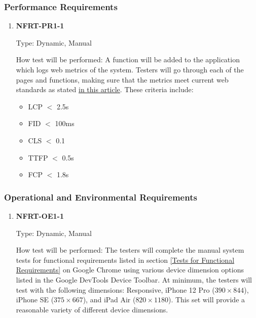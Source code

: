 \documentclass[12pt, titlepage]{article}
\begin{document}
\subsubsection{Performance Requirements}
\begin{enumerate}
	\item \textbf{NFRT-PR1-1} %

	      Type: Dynamic, Manual

	      How test will be performed: A function will be added to the application which logs web metrics of
	      the system. Testers will go through each of the pages and functions, making sure that the metrics
	      meet current web standards as stated \href{https://web.dev/vitals/}{in this article}. These
	      criteria include:
	      \begin{itemize}
		      \item LCP $<$ 2.5s
		      \item FID $<$ 100ms
		      \item CLS $<$ 0.1
		      \item TTFP $<$ 0.5s
		      \item FCP $<$ 1.8s
	      \end{itemize}

\end{enumerate}

\subsubsection{Operational and Environmental Requirements}
\begin{enumerate}

	\item \textbf{NFRT-OE1-1} %

	      Type: Dynamic, Manual

	      How test will be performed: The testers will complete the manual system tests for functional
	      requirements listed in section \ref{Tests for Functional Requirements} on Google Chrome using
	      various device dimension options listed in the Google DevTools Device Toolbar. At minimum, the
	      testers will test with the following dimensions: Responsive, iPhone 12 Pro ($390 \times 844$),
	      iPhone SE ($375 \times 667$), and iPad Air ($820 \times 1180$). This set will provide a reasonable
	      variety of different device dimensions.

\end{enumerate}
\end{document}
